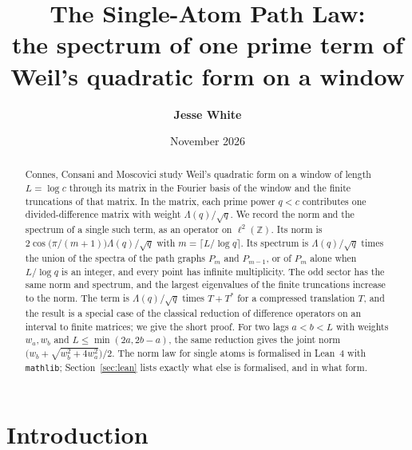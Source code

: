 \documentclass[11pt,a4paper]{article}
\title{\textbf{The Single-Atom Path Law:}\\[0.3em]
\large the spectrum of one prime term of Weil's quadratic form on a window}
\author{\textbf{Jesse White}}
\date{November 2026}
\theoremstyle{plain}
\theoremstyle{definition}
\theoremstyle{remark}
\newcommand{\Z}{\mathbb{Z}}
\begin{document}
\maketitle

\begin{abstract}
Connes, Consani and Moscovici study Weil's quadratic form on a window of length $L = \log c$ through its matrix in the Fourier basis of the window and the finite truncations of that matrix. In the matrix, each prime power $q < c$ contributes one divided-difference matrix with weight $\Lambda(q)/\sqrt q$. We record the norm and the spectrum of a single such term, as an operator on $\ell^2(\Z)$. Its norm is $2\cos\bigl(\pi/(m+1)\bigr)\Lambda(q)/\sqrt q$ with $m = \lceil L/\log q\rceil$. Its spectrum is $\Lambda(q)/\sqrt q$ times the union of the spectra of the path graphs $P_m$ and $P_{m-1}$, or of $P_m$ alone when $L/\log q$ is an integer, and every point has infinite multiplicity. The odd sector has the same norm and spectrum, and the largest eigenvalues of the finite truncations increase to the norm. The term is $\Lambda(q)/\sqrt q$ times $T + T^{*}$ for a compressed translation $T$, and the result is a special case of the classical reduction of difference operators on an interval to finite matrices; we give the short proof. For two lags $a < b < L$ with weights $w_a, w_b$ and $L \le \min(2a, 2b-a)$, the same reduction gives the joint norm ${\bigl(w_b + \sqrt{w_b^2 + 4w_a^2}\bigr)/2}$. The norm law for single atoms is formalised in Lean~4 with \texttt{mathlib}; Section~\ref{sec:lean} lists exactly what else is formalised, and in what form.
\end{abstract}

\section{Introduction}\label{sec:intro}
\end{document}
